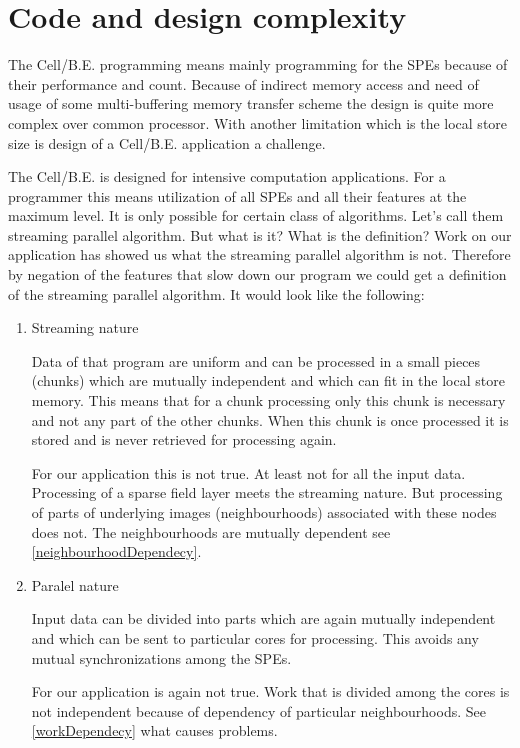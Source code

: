 \section{Code and design complexity}

\par
The \mbox{Cell/B.E.} programming means mainly programming for the SPEs because of their performance and count.
Because of indirect memory access and need of usage of some multi-buffering memory transfer scheme the design is quite more complex over common processor.
With another limitation which is the local store size is design of a \mbox{Cell/B.E.} application a challenge.

\par
The \mbox{Cell/B.E.} is designed for intensive computation applications.
For a programmer this means utilization of all SPEs and all their features at the maximum level.
It is only possible for certain class of algorithms.
Let's call them streaming parallel algorithm.
But what is it? What is the definition?
Work on our application has showed us what the streaming parallel algorithm is not.
Therefore by negation of the features that slow down our program we could get a definition of the streaming parallel algorithm.
It would look like the following:

\begin{enumerate}

\item{Streaming nature}
\par
Data of that program are uniform and can be processed in a small pieces (chunks) which are mutually independent and which can fit in the local store memory.
This means that for a chunk processing only this chunk is necessary and not any part of the other chunks.
When this chunk is once processed it is stored and is never retrieved for processing again.

\par
For our application this is not true.
At least not for all the input data.
Processing of a sparse field layer meets the streaming nature.
But processing of parts of underlying images (neighbourhoods) associated with these nodes does not.
The neighbourhoods are mutually dependent see \ref{neighbourhoodDependecy}.

\item{Paralel nature}
\par
Input data can be divided into parts which are again mutually independent and which can be sent to particular cores for processing.
This avoids any mutual synchronizations among the SPEs.

\par
For our application is again not true.
Work that is divided among the cores is not independent because of dependency of particular neighbourhoods.
See \ref{workDependecy} what causes problems.

\end{enumerate}

